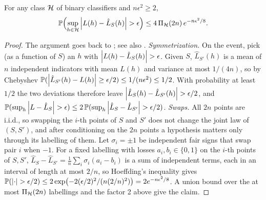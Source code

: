 \begin{lemma}
\label{lem:uc}
For any class $\mathcal{H}$ of binary classifiers and $n\epsilon^2\ge2$,
\[ \mathbb{P}\Bigl(\sup_{h\in\mathcal{H}}\left\lvert L(h)-\hat L_S(h) \right\rvert>\epsilon\Bigr)\le4\,\Pi_{\mathcal{H}}(2n)\,e^{-n\epsilon^2/8}. \]
\end{lemma}
\begin{proof}
The argument goes back to \citet{vapnik1971uniform}; see also \citet{shalevshwartz2014understanding}.
\emph{Symmetrization.} On the event, pick (as a function of $S$) an $h$ with
$\left\lvert L(h)-\hat L_S(h) \right\rvert>\epsilon$. Given $S$, $\hat L_{S'}(h)$ is a mean of $n$ independent
indicators with mean $L(h)$ and variance at most $1/(4n)$, so by Chebyshev
$\mathbb{P}(\left\lvert \hat L_{S'}(h)-L(h) \right\rvert\ge\epsilon/2)\le1/(n\epsilon^2)\le1/2$. With probability at least
$1/2$ the two deviations therefore leave $\left\lvert \hat L_S(h)-\hat L_{S'}(h) \right\rvert>\epsilon/2$, and
$\mathbb{P}(\sup_h\left\lvert L-\hat L_S \right\rvert>\epsilon)\le2\,\mathbb{P}(\sup_h\left\lvert \hat L_S-\hat L_{S'} \right\rvert>\epsilon/2)$.
\emph{Swaps.} All $2n$ points are i.i.d., so swapping the $i$-th points of $S$ and $S'$ does not
change the joint law of $(S,S')$, and after conditioning on the $2n$ points a hypothesis matters only
through its labelling of them. Let $\sigma_i=\pm1$ be independent fair signs that swap pair $i$ when $-1$. For a
fixed labelling with losses $a_i,b_i\in\{0,1\}$ on the $i$-th points of $S,S'$,
$\hat L_S-\hat L_{S'}=\frac1n\sum_i\sigma_i(a_i-b_i)$ is a sum of independent terms, each in an
interval of length at most $2/n$, so Hoeffding's inequality gives
$\mathbb{P}(\left\lvert \cdot \right\rvert>\epsilon/2)\le2\exp\bigl(-2(\epsilon/2)^2/(n(2/n)^2)\bigr)=2e^{-n\epsilon^2/8}$.
A union bound over the at most $\Pi_{\mathcal{H}}(2n)$ labellings and the factor 2 above give the claim.
\end{proof}

